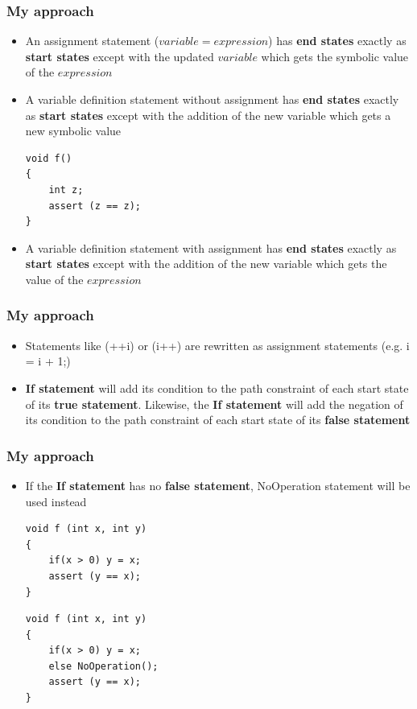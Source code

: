 \documentclass{beamer}
\begin{document}
\begin{frame}[fragile]
\frametitle{My approach}
\begin{itemize}
\item An assignment statement ($variable = expression$) has \textbf{end states} exactly as \textbf{start states} except with the updated $variable$ which gets the symbolic value of the $expression$

\item A variable definition statement without assignment has \textbf{end states} exactly as \textbf{start states} except with the addition of the new variable which gets a new symbolic value

\begin{lstlisting}  
void f()
{
	int z;
	assert (z == z);
}
\end{lstlisting}

\item  A variable definition statement with assignment has \textbf{end states} exactly as \textbf{start states} except with the addition of the new variable which gets the value of the $expression$

\end{itemize}
\end{frame}

\begin{frame}[fragile]
\frametitle{My approach}
\begin{itemize}
\item Statements like (++i) or (i++) are rewritten as assignment statements (e.g. i = i + 1;)
\item \textbf{If statement} will add its condition to the path constraint of each start state of its
\textbf{true statement}. Likewise, the \textbf{If statement} will add the negation of its condition to the
path constraint of each start state of its \textbf{false statement}


\end{itemize}
\end{frame}


\begin{frame}[fragile]
\frametitle{My approach}
\begin{itemize}

\item If the \textbf{If statement} has no \textbf{false statement}, NoOperation statement will be used instead

\begin{lstlisting}  
void f (int x, int y) 
{ 
	if(x > 0) y = x;  
	assert (y == x);
}
\end{lstlisting}

\begin{lstlisting}  
void f (int x, int y) 
{ 
	if(x > 0) y = x;  
	else NoOperation();
	assert (y == x);
}
\end{lstlisting}

\end{itemize}
\end{frame}
\end{document}
